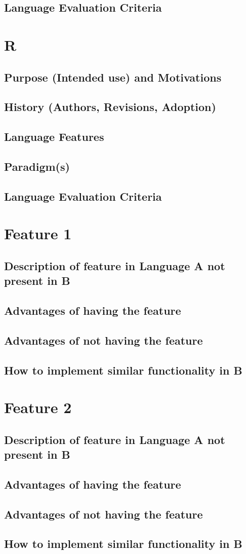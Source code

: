 \documentclass{article}
\begin{document}
\subsection*{Language Evaluation Criteria}

\section*{R}
\subsection*{Purpose (Intended use) and Motivations}
\subsection*{History (Authors, Revisions, Adoption)}
\subsection*{Language Features}
\subsection*{Paradigm(s)}
\subsection*{Language Evaluation Criteria}

\section*{Feature 1}
\subsection*{Description of feature in Language A not present in B}
\subsection*{Advantages of having the feature}
\subsection*{Advantages of not having the feature}
\subsection*{How to implement similar functionality in B}

\section*{Feature 2}
\subsection*{Description of feature in Language A not present in B}
\subsection*{Advantages of having the feature}
\subsection*{Advantages of not having the feature}
\subsection*{How to implement similar functionality in B}
\end{document}

